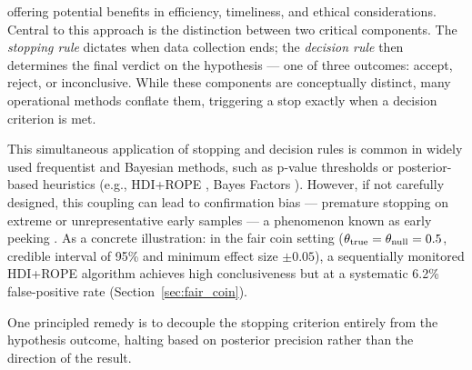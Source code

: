 offering potential benefits in efficiency, timeliness, and ethical considerations.
Central to this approach is the distinction between two critical components.
The \textit{stopping rule} dictates when data collection ends; the
\textit{decision rule} then determines the final verdict on the hypothesis ---
one of three outcomes: accept, reject, or inconclusive.
While these components are conceptually distinct, many operational methods
conflate them, triggering a stop exactly when a decision criterion is met.

This simultaneous application of stopping and decision rules is common in widely used
frequentist and Bayesian methods, such as p-value thresholds \citep{fisher1925} or posterior-based heuristics
(e.g., HDI+ROPE \citealp{kruschke2011, kruschke2013, kruschke2015doing},
Bayes Factors \citealp{kassraftery1995}).
However, if not carefully designed, this coupling can lead to confirmation bias ---
premature stopping on extreme or unrepresentative early samples --- a phenomenon known
as early peeking \citep{simmons2011}.
As a concrete illustration: in the fair coin setting
($\theta_{\rm true}=\theta_{\rm null}=0.5$, credible interval of 95\% and minimum effect size $\pm 0.05$),
a sequentially monitored HDI+ROPE algorithm achieves high conclusiveness
but at a systematic 6.2\% false-positive rate (Section~\ref{sec:fair_coin}).

One principled remedy is to decouple the stopping criterion entirely from the hypothesis
outcome, halting based on posterior precision rather than the direction of the result.

